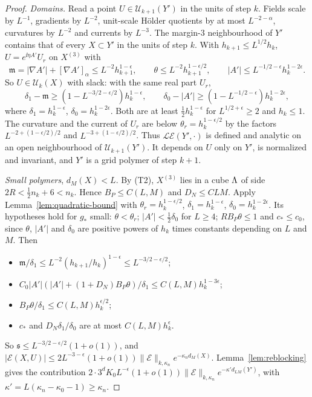 \begin{proof}
\emph{Domains.} Read a point $U\in\mathcal U_{k+1}(Y')$ in the units of step $k$. Fields scale by $L^{-1}$, gradients by $L^{-2}$, unit-scale H\"older quotients by at most $L^{-2-\alpha}$, curvatures by $L^{-2}$ and currents by $L^{-3}$. The margin-$3$ neighbourhood of $Y'$ contains that of every $X\subset Y'$ in the units of step $k$. With $h_{k+1}\le L^{1/2}h_k$, $U=e^{\ii\eta A'}U_r$ on $X^{(3)}$ with
\[
\mathfrak m=|\nabla A'|+[\nabla A']_\alpha\le L^{-2}h_{k+1}^{1-\epsilon},\qquad\theta\le L^{-2}h_{k+1}^{1-\epsilon/2},\qquad|A'|\le L^{-1/2-\epsilon}h_k^{1-2\epsilon}.
\]
So $U\in\mathcal U_k(X)$ with slack: with the same real part $U_r$,
\begin{equation}\label{eq:domain-slack}
\delta_1-\mathfrak m\ge(1-L^{-3/2-\epsilon/2})h_k^{1-\epsilon},\qquad\delta_0-|A'|\ge(1-L^{-1/2-\epsilon})h_k^{1-2\epsilon},
\end{equation}
where $\delta_1=h_k^{1-\epsilon}$, $\delta_0=h_k^{1-2\epsilon}$. Both are at least $\frac12h_k^{1-\epsilon}$ for $L^{1/2+\epsilon}\ge2$ and $h_k\le1$. The curvature and the current of $U_r$ are below $\theta_r=h_k^{1-\epsilon/2}$ by the factors $L^{-2+(1-\epsilon/2)/2}$ and $L^{-3+(1-\epsilon/2)/2}$. Thus $\mathcal L\mathcal E(Y',\cdot)$ is defined and analytic on an open neighbourhood of $\mathcal U_{k+1}(Y')$. It depends on $U$ only on $Y'$, is normalized and invariant, and $Y'$ is a grid polymer of step $k+1$.

\emph{Small polymers}, $d_M(X)<L$. By (T2), $X^{(3)}$ lies in a cube $\Lambda$ of side $2R<\frac12n_k+6<n_k$. Hence $B_P\le C(L,M)$ and $D_N\le CLM$. Apply Lemma~\ref{lem:quadratic-bound} with $\theta_r=h_k^{1-\epsilon/2}$, $\delta_1=h_k^{1-\epsilon}$, $\delta_0=h_k^{1-2\epsilon}$. Its hypotheses hold for $g_*$ small: $\theta<\theta_r$; $|A'|<\frac12\delta_0$ for $L\ge4$; $RB_P\theta\le1$ and $c_*\le c_0$, since $\theta$, $|A'|$ and $\delta_0$ are positive powers of $h_k$ times constants depending on $L$ and $M$. Then
\begin{itemize}
\item $\mathfrak m/\delta_1\le L^{-2}(h_{k+1}/h_k)^{1-\epsilon}\le L^{-3/2-\epsilon/2}$;
\item $C_0|A'|(|A'|+(1+D_N)B_P\theta)/\delta_1\le C(L,M)h_k^{1-3\epsilon}$;
\item $B_P\theta/\delta_1\le C(L,M)h_k^{\epsilon/2}$;
\item $c_*$ and $D_N\delta_1/\delta_0$ are at most $C(L,M)h_k^{\epsilon}$.
\end{itemize}
So $\mathfrak s\le L^{-3/2-\epsilon/2}(1+o(1))$, and $|\mathcal E(X,U)|\le2L^{-3-\epsilon}(1+o(1))\|\mathcal E\|_{k,\kappa_n}e^{-\kappa_nd_M(X)}$. Lemma~\ref{lem:reblocking} gives the contribution $2\cdot3^dK_0L^{-\epsilon}(1+o(1))\|\mathcal E\|_{k,\kappa_n}e^{-\kappa'd_{LM}(Y')}$, with $\kappa'=L(\kappa_n-\kappa_0-1)\ge\kappa_n$.


\end{proof}
